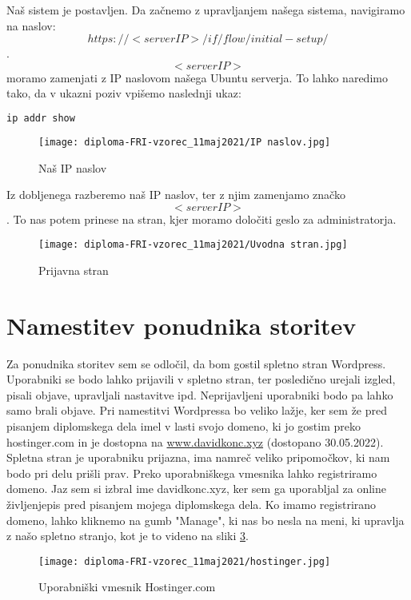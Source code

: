 \documentclass[a4paper,12pt,openright]{book}
\begin{document}
Naš sistem je postavljen. Da začnemo z upravljanjem našega sistema, navigiramo na naslov: $$https://<serverIP>/if/flow/initial-setup/$$. $$<serverIP>$$ moramo zamenjati z IP naslovom našega Ubuntu serverja. To lahko naredimo tako, da v ukazni poziv vpišemo naslednji ukaz:
\begin{lstlisting}[language=bash]
ip addr show
\end{lstlisting}

\begin{figure}[H]
\texttt{[image: diploma-FRI-vzorec\_11maj2021/IP naslov.jpg]}
\caption{Naš IP naslov}
\label{fig:student}
\end{figure}

Iz dobljenega razberemo naš IP naslov, ter z njim zamenjamo značko $$<serverIP>$$. To nas potem prinese na stran, kjer moramo določiti geslo za administratorja. 

\begin{figure}[H]
\texttt{[image: diploma-FRI-vzorec\_11maj2021/Uvodna stran.jpg]}
\caption{Prijavna stran}
\label{fig}
\end{figure}


\section{Namestitev ponudnika storitev}

Za ponudnika storitev sem se odločil, da bom gostil spletno stran Wordpress. Uporabniki se bodo lahko prijavili v spletno stran, ter posledično urejali izgled, pisali objave, upravljali nastavitve ipd. 
Neprijavljeni uporabniki bodo pa lahko samo brali objave. 
\newline
Pri namestitvi Wordpressa bo veliko lažje, ker sem že pred pisanjem diplomskega dela imel v lasti svojo domeno, ki jo gostim preko hostinger.com in je dostopna na \href{www.davidkonc.xyz}{www.davidkonc.xyz} (dostopano 30.05.2022). 
\newline
Spletna stran je uporabniku prijazna, ima namreč veliko pripomočkov, ki nam bodo pri delu prišli prav.
Preko uporabniškega vmesnika lahko registriramo domeno. Jaz sem si izbral ime davidkonc.xyz, ker sem ga uporabljal za online življenjepis pred pisanjem mojega diplomskega dela. 
\newline
Ko imamo registrirano domeno, lahko kliknemo na gumb "Manage", ki nas bo nesla na meni, ki upravlja z našo spletno stranjo, kot je to videno na sliki \ref{fig:hostinger}.

\begin{figure}[H]
\hspace{-3,5cm}
\texttt{[image: diploma-FRI-vzorec\_11maj2021/hostinger.jpg]}
\caption{Uporabniški vmesnik Hostinger.com}
\label{fig:hostinger}
\end{figure}
\end{document}
